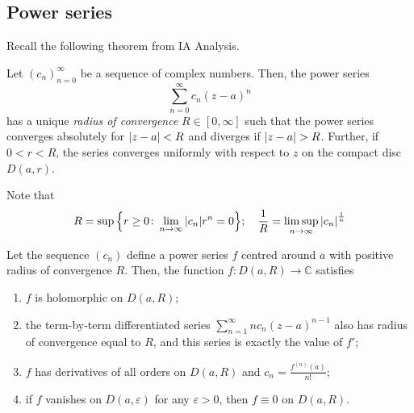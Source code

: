 \subsection{Power series}
Recall the following theorem from IA Analysis.
\begin{theorem}
	Let \( (c_n)_{n=0}^\infty \) be a sequence of complex numbers.
	Then, the power series
	\[
		\sum_{n=0}^\infty c_n (z-a)^n
	\]
	has a unique \textit{radius of convergence} \( R \in [0,\infty] \) such that the power series converges absolutely for \( \abs{z - a} < R \) and diverges if \( \abs{z - a} > R \).
	Further, if \( 0 < r < R \), the series converges uniformly with respect to \( z \) on the compact disc \( D(a,r) \).
\end{theorem}
Note that
\[
	R = \sup\qty{r \geq 0 \colon \lim_{n \to \infty} \abs{c_n}r^n = 0};\quad \frac{1}{R} = \limsup_{n \to \infty} \abs{c_n}^{\frac{1}{n}}
\]
\begin{theorem}
	Let the sequence \( (c_n) \) define a power series \( f \) centred around \( a \) with positive radius of convergence \( R \).
	Then, the function \( f \colon D(a,R) \to \mathbb C \) satisfies
	\begin{enumerate}
		\item \( f \) is holomorphic on \( D(a,R) \);
		\item the term-by-term differentiated series \( \sum_{n=1}^\infty nc_n(z-a)^{n-1} \) also has radius of convergence equal to \( R \), and this series is exactly the value of \( f' \);
		\item \( f \) has derivatives of all orders on \( D(a,R) \) and \( c_n = \frac{f^{(n)}(a)}{n!} \);
		\item if \( f \) vanishes on \( D(a, \varepsilon) \) for any \( \varepsilon > 0 \), then \( f \equiv 0 \) on \( D(a,R) \).
	\end{enumerate}
\end{theorem}
